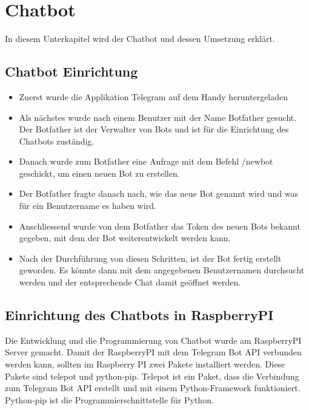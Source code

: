 \section{Chatbot}
In diesem Unterkapitel wird der Chatbot und dessen Umsetzung erklärt.
\subsection{Chatbot Einrichtung}
\begin{itemize}
	\item Zuerst wurde die Applikation Telegram auf dem Handy heruntergeladen
\end{itemize}
\begin{itemize}
	\item Als nächstes wurde nach einem Benutzer mit der Name Botfather gesucht. Der Botfather ist der Verwalter von Bots und ist für die Einrichtung des Chatbots zuständig.
\end{itemize}
\begin{itemize}
	\item Danach wurde zum Botfather eine Anfrage mit dem Befehl /newbot geschickt, um einen neuen Bot zu erstellen. 
\end{itemize}
\begin{itemize}
	\item Der Botfather fragte danach nach, wie das neue Bot genannt wird und was für ein Benutzername es haben wird.  
\end{itemize}
\begin{itemize}
	\item Anschliessend wurde von dem Botfather das Token des neuen Bots bekannt gegeben, mit dem der Bot weiterentwickelt werden kann. 
\end{itemize}
\begin{itemize}
	\item Nach der Durchführung von diesen Schritten, ist der Bot fertig erstellt geworden. Es könnte dann mit dem angegebenen Benutzernamen durchsucht werden und der entsprechende Chat damit geöffnet werden. 
\end{itemize}
\subsection{Einrichtung des Chatbots in RaspberryPI}
Die Entwicklung und die Programmierung von Chatbot wurde am RaspberryPI Server gemacht. Damit der RaspberryPI mit dem Telegram Bot API verbunden werden kann, sollten im Raspberry PI zwei Pakete installiert werden. Diese Pakete sind telepot und python-pip. Telepot ist ein Paket, dass die Verbindung zum Telegram Bot API erstellt und mit einem Python-Framework funktioniert. Python-pip ist die Programmierschnittstelle für Python.\cite{50_telegram}
